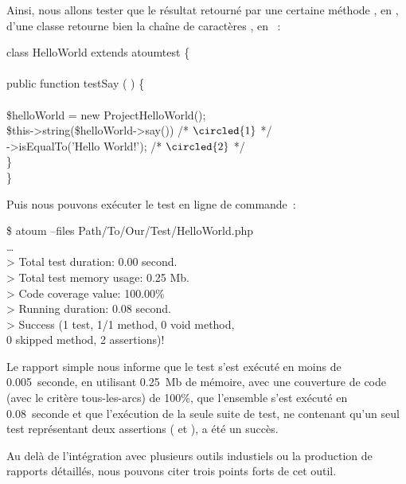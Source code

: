 \begin{example}
\label{example:tools:first-test}

Ainsi, nous allons tester que le résultat retourné par une certaine méthode
, en , d'une classe 
retourne bien la chaîne de caractères , en ~:
%
\begin{pre}
class HelloWorld extends \bslash{}atoum\bslash{}test \{ \\
 \\
    public function testSay ( ) \{ \\
 \\
        \$helloWorld = new \bslash{}Project\bslash{}HelloWorld(); \\
        \$this->string(\$helloWorld->say())      /* \(\circled{1}\) */ \\
                  ->isEqualTo('Hello World!'); /* \(\circled{2}\) */ \\
    \} \\
\}
\end{pre}
%
Puis nous pouvons exécuter le test en ligne de commande~:
%
\begin{pre}
\$ atoum --files Path/To/Our/Test/HelloWorld.php \\
… \\
> Total test duration: 0.00 second. \\
> Total test memory usage: 0.25 Mb. \\
> Code coverage value: 100.00\% \\
> Running duration: 0.08 second. \\
> Success (1 test, 1/1 method, 0 void method, \\
           0 skipped method, 2 assertions)!
\end{pre}
%
Le rapport simple nous informe que le test s'est exécuté en moins de
0.005~seconde, en utilisant 0.25~Mb de mémoire, avec une couverture de code
(avec le critère tous-les-arcs) de 100\%, que l'ensemble s'est exécuté en
0.08~seconde et que l'exécution de la seule suite de test, ne contenant qu'un
seul test représentant deux assertions ( et ), a
été un succès.

\end{example}

Au delà de l'intégration avec plusieurs outils industiels ou la production de
rapports détaillés, nous pouvons citer trois points forts de cet outil.

